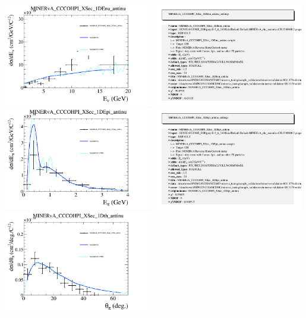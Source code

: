 \documentclass{article}
\begin{document}
\centering
\includegraphics[width=0.49\textwidth]{figures/nuisance_MINERvA_CCCOHPI_XSec_1DEnu_antinu_comp.png}
\includegraphics[width=0.49\textwidth]{figures/nuisance_MINERvA_CCCOHPI_XSec_1DEnu_antinu_info.png}
\centering
\includegraphics[width=0.49\textwidth]{figures/nuisance_MINERvA_CCCOHPI_XSec_1DEpi_antinu_comp.png}
\includegraphics[width=0.49\textwidth]{figures/nuisance_MINERvA_CCCOHPI_XSec_1DEpi_antinu_info.png}
\centering
\includegraphics[width=0.49\textwidth]{figures/nuisance_MINERvA_CCCOHPI_XSec_1Dth_antinu_comp.png}
\end{document}

